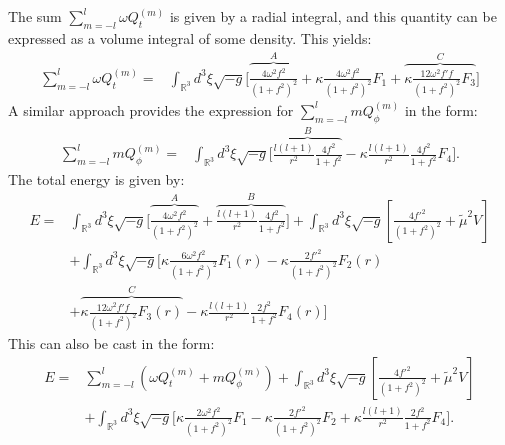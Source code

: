 \documentclass[aps,prd,superscriptaddress,notitlepage,11pt,final,longbibliography,nofootinbib]{revtex4-1}
\numberwithin{equation}{section}
\begin{document}
The sum $\sum_{m=-l}^l\omega Q_t^{(m)}$ is given by a radial integral, and this quantity can be expressed as a volume integral of some density. This yields:
\begin{align}
\sum_{m=-l}^l\omega Q_t^{(m)}=&\int_{{\mathbb{R}}^3}d^3\xi\sqrt{-g}\Bigg[\overbrace{\frac{4\omega^2f^2}{(1+f^2)^2}}^A+\kappa\frac{4\omega^2f^2}{(1+f^2)^2}F_1+\overbrace{\kappa\frac{12\omega^2f'f}{(1+f^2)^2}F_3}^C\Bigg]
\end{align}
A similar approach provides the expression for $\sum_{m=-l}^lm Q_\phi^{(m)}$ in the form:
\begin{align}
\sum_{m=-l}^lm Q_\phi^{(m)}=&\int_{{\mathbb{R}}^3}d^3\xi\sqrt{-g}\Bigg[\overbrace{\frac{l(l+1)}{r^2}\frac{4f^2}{1+f^2}}^B-\kappa\frac{l(l+1)}{r^2}\frac{4f^2}{1+f^2}F_4\Bigg].
\end{align}
The total energy is given by:
\begin{align}
E=&\int_{{\mathbb{R}}^3}d^3\xi\sqrt{-g}\Bigg[\overbrace{\frac{4\omega^2f^2}{(1+f^2)^2}}^A+\overbrace{\frac{l(l+1)}{r^2}\frac{4f^2}{1+f^2}}^B\Bigg]+\int_{{\mathbb{R}}^3}d^3\xi\sqrt{-g}\left[\frac{4f'^2}{(1+f^2)^2}+\tilde\mu^2V\right]\nonumber\\
&+\int_{{\mathbb{R}}^3}d^3\xi\sqrt{-g}\Bigg[\kappa\frac{6\omega^2f^2}{(1+f^2)^2}F_1(r)-\kappa\frac{2f'^2}{(1+f^2)^2}F_2(r)\nonumber\\ &+\overbrace{\kappa\frac{12\omega^2 f'f}{(1+f^2)^2}F_3(r)}^C-\kappa\frac{l(l+1)}{r^2}\frac{2f^2}{1+f^2}F_4(r)\Bigg]\label{engC1}
\end{align}
This can also be cast in the form:
\begin{align}
E=&\sum_{m=-l}^l\left(\omega Q_t^{(m)}+m Q_\phi^{(m)}\right)+\int_{{\mathbb{R}}^3}d^3\xi\sqrt{-g}\left[\frac{4f'^2}{(1+f^2)^2}+\tilde\mu^2V\right]\nonumber\\
&+\int_{{\mathbb{R}}^3}d^3\xi\sqrt{-g}\Bigg[\kappa\frac{2\omega^2f^2}{(1+f^2)^2}F_1-\kappa\frac{2f'^2}{(1+f^2)^2}F_2+\kappa \frac{l(l+1)}{r^2}\frac{2f^2}{1+f^2}F_4\Bigg].\label{engC2}
\end{align}






\end{document}
